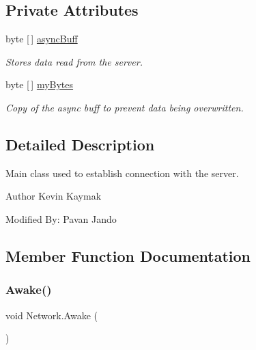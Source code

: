 \subsection*{Private Attributes}
\begin{DoxyCompactItemize}
\item 
byte \mbox{[}$\,$\mbox{]} \mbox{\hyperlink{class_network_a514e88f1b6a82d1c2de4e3e3b197c529}{async\+Buff}}
\begin{DoxyCompactList}\small\item\em Stores data read from the server. \end{DoxyCompactList}\item 
byte \mbox{[}$\,$\mbox{]} \mbox{\hyperlink{class_network_af6127d2e2616cfd231e2456e995e334a}{my\+Bytes}}
\begin{DoxyCompactList}\small\item\em Copy of the async buff to prevent data being overwritten. \end{DoxyCompactList}\end{DoxyCompactItemize}


\subsection{Detailed Description}
Main class used to establish connection with the server. 

\begin{DoxyAuthor}{Author}
Kevin Kaymak 

Modified By\+: Pavan Jando
\end{DoxyAuthor}


\subsection{Member Function Documentation}
\mbox{\label{class_network_a06900213a71f1f8d61c67ca99cb78df9}} 
\subsubsection{\texorpdfstring{Awake()}{Awake()}}
{\footnotesize\ttfamily void Network.\+Awake (\begin{DoxyParamCaption}{ }\end{DoxyParamCaption})\hspace{0.3cm}{\ttfamily [private]}}



